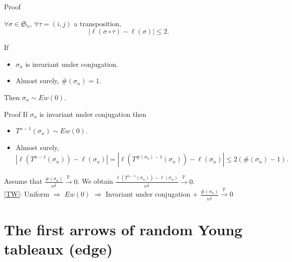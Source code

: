 \documentclass[english,xcolor=table]{beamer}
\begin{document}
\begin{frame}{Proof}
\begin{lemma} \label{lem}
 $\forall \sigma \in  \mathfrak{S}_n$,  $ \forall\tau=(i,j)$ a transposition, 
\begin{equation*}
|\ell(\sigma \circ \tau )-\ell(\sigma)|\leq 2.
\end{equation*}
\end{lemma}
\begin{lemma}
If
\begin{itemize}
    \item $\sigma_n$ is invariant under conjugation. 
    \item Almost surely, $\#(\sigma_n)=1$.
\end{itemize}
Then  $\sigma_n \sim Ew(0).$
\end{lemma}
\end{frame}

\begin{frame}{Proof}
If $\sigma_n$ is invariant under conjugation then
\begin{itemize}
    \item $T^{n-1}(\sigma_n)\sim Ew(0).$
    \item Almost surely, $$
|\ell(T^{n-1}(\sigma_n))-\ell(\sigma_n)|=
|\ell(T^{\#(\sigma_n)-1}(\sigma_n))-\ell(\sigma_n)|
\leq  2(\#(\sigma_n)-1).$$
\end{itemize}
Assume that  $\frac{\#(\sigma_n)}{n^\frac16} \overset{\mathbb{P}}\to 0 $.  We obtain $\frac{\ell(T^{n-1}(\sigma_n))-\ell(\sigma_n)}{n^\frac 16} \overset{\mathbb{P}}\to 0$.
\\ 

\eqref{TW}: Uniform $\Rightarrow$ $Ew(0)$ $\Rightarrow$  Invariant under conjugation +   $\frac{\#(\sigma_n)}{n^\frac16} \overset{\mathbb{P}}\to 0 $
\end{frame}
\section{The first arrows of random Young tableaux (edge)}
\end{document}
